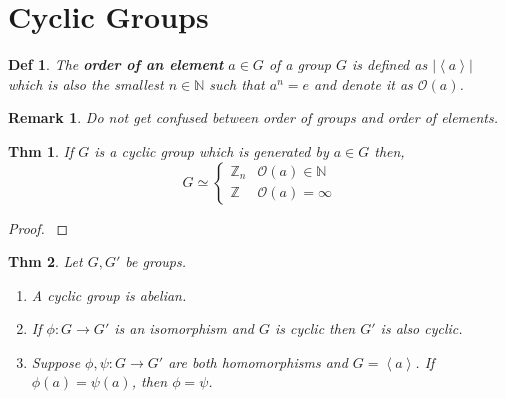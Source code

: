\documentclass[paper=a4, fontsize=11pt]{scrartcl}
\newcommand{\Zn}[1]{\mathbb{Z}_{#1}}
\newcommand{\cyc}[1]{\left< #1 \right>}
\newcommand{\nextline}{$ $ \newline \vspace{-0.15in}}
\newtheorem{theorem}{Thm}
\newtheorem{definition}{Def}
\newtheorem*{remark}{Remark}
\begin{document}
\vspace{0.25in}
\section{Cyclic Groups}
\vspace{0.25in}

\begin{definition}
	The \textbf{order of an element} $a\in G$ of a group $G$ is defined as $|\cyc{a}|$ which is also the smallest $n\in \mathbb{N}$ such that $a^n=e$ and denote it as $\mathcal{O}(a)$.\\
\end{definition}

\begin{remark}
	Do not get confused between order of groups and order of elements.\\
\end{remark}

\begin{theorem}
	If $G$ is a cyclic group which is generated by $a \in G$ then,
	\begin{equation}\nonumber
		G \simeq 
		\begin{cases}
		\Zn{n} & \mathcal{O}(a)\in\mathbb{N} \\ 
		\mathbb{Z} & \mathcal{O}(a) = \infty
		\end{cases}
	\end{equation}
\end{theorem}

\begin{proof}
\nextline
{}
\end{proof}

\begin{theorem}
	Let $G,G'$ be groups.
	\begin{enumerate}
		\item A cyclic group is abelian.
		\item If $\phi:G\to G'$ is an isomorphism and $G$ is cyclic then $G'$ is also cyclic.
		\item Suppose $\phi,\psi:G\to G'$ are both homomorphisms and $G=\cyc{a}$. If $\phi(a)=\psi(a)$, then $\phi=\psi$.\\
	\end{enumerate}
\end{theorem}
\end{document}
